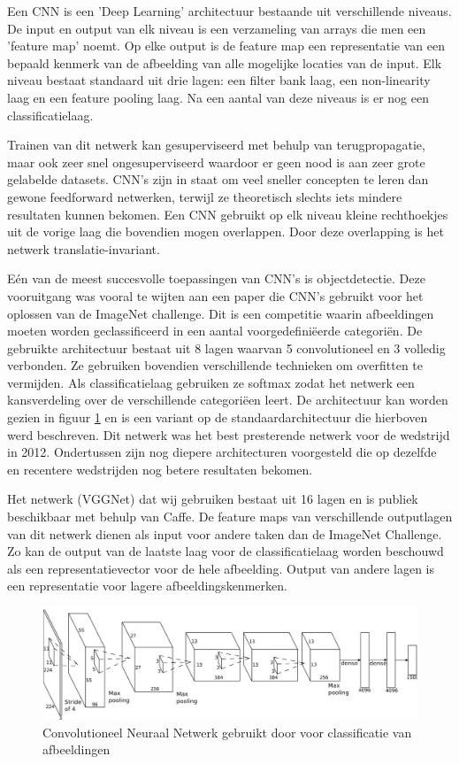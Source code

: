 Een CNN is een 'Deep Learning' architectuur bestaande uit verschillende niveaus. De input en output van elk niveau is een verzameling van arrays die men een 'feature map' noemt. Op elke output is de feature map een representatie van een bepaald kenmerk van de afbeelding van alle mogelijke locaties van de input. Elk niveau bestaat standaard uit drie lagen: een filter bank laag, een non-linearity laag en een feature pooling laag. Na een aantal van deze niveaus is er nog een classificatielaag.

Trainen van dit netwerk kan gesuperviseerd met behulp van terugpropagatie, maar ook zeer snel ongesuperviseerd waardoor er geen nood is aan zeer grote gelabelde datasets. CNN's zijn in staat om veel sneller concepten te leren dan gewone feedforward netwerken, terwijl ze theoretisch slechts iets mindere resultaten kunnen bekomen. Een CNN gebruikt op elk niveau kleine rechthoekjes uit de vorige laag die bovendien mogen overlappen. Door deze overlapping is het netwerk translatie-invariant.

E\'en van de meest succesvolle toepassingen van CNN's is objectdetectie. Deze vooruitgang was vooral te wijten aan een paper\cite{Krizhevsky2012a} die CNN's gebruikt voor het oplossen van de ImageNet challenge.\cite{Russakovsky2014}
Dit is een competitie waarin afbeeldingen moeten worden geclassificeerd in een aantal voorgedefini\"eerde categori\"en. De gebruikte architectuur bestaat uit 8 lagen waarvan 5 convolutioneel en 3 volledig verbonden. Ze gebruiken bovendien verschillende technieken om overfitten te vermijden. Als classificatielaag gebruiken ze softmax zodat het netwerk een kansverdeling over de verschillende categori\"een leert. De architectuur kan worden gezien in figuur \ref{fig:AlexNet} en  is een variant op de standaardarchitectuur die hierboven werd beschreven. Dit netwerk was het best presterende netwerk voor de wedstrijd in 2012. Ondertussen zijn nog diepere architecturen voorgesteld die op dezelfde en recentere wedstrijden nog betere resultaten bekomen.

Het netwerk (VGGNet)\cite{Arge2015} dat wij gebruiken bestaat uit 16 lagen en is publiek beschikbaar met behulp van Caffe\cite{Jia2014}. De feature maps van verschillende outputlagen van dit netwerk dienen als input voor andere taken dan de ImageNet Challenge. Zo kan de output van de laatste laag voor de classificatielaag worden beschouwd als een representatievector voor de hele afbeelding. Output van andere lagen is een representatie voor lagere  afbeeldingskenmerken.
\begin{figure}[tb]
	\centering
	\includegraphics[width=\linewidth]{Images/cnn.PNG}
    \caption{Convolutioneel Neuraal Netwerk gebruikt door \cite{Krizhevsky2012a} voor classificatie van afbeeldingen}
	\label{fig:AlexNet}
\end{figure}


